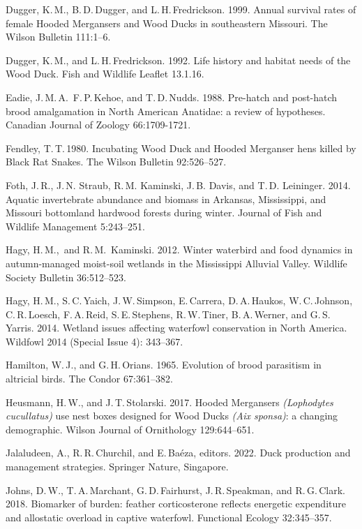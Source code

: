 \begin{hangparas}{2em}{1}
	Dugger, K.\,M., B.\,D.\,Dugger, and L.\,H.\,Fredrickson. 1999. Annual survival rates of female Hooded Mergansers and Wood Ducks in southeastern Missouri. The Wilson Bulletin 111:1–6. 
	
	Dugger, K.\,M., and L.\,H.\,Fredrickson. 1992. Life history and habitat needs of the Wood Duck. Fish and Wildlife Leaflet 13.1.16.
	
	Eadie, J.\,M.\,A.\, F.\,P.\,Kehoe, and T.\,D.\,Nudds. 1988. Pre-hatch and post-hatch brood amalgamation in North American Anatidae: a review of hypotheses. Canadian Journal of Zoology 66:1709-1721.
	
	Fendley, T.\,T.\,1980. Incubating Wood Duck and Hooded Merganser hens killed by Black Rat Snakes. The Wilson Bulletin 92:526–527. 
	
	Foth, J.\,R., J.\,N. Straub, R.\,M. Kaminski, J.\,B. Davis, and T.\,D. Leininger. 2014. Aquatic invertebrate abundance and biomass in Arkansas, Mississippi, and Missouri bottomland hardwood forests during winter. Journal of Fish and Wildlife Management 5:243–251. 
	
	Hagy, H.\,M.,~and R.\,M.\, Kaminski. 2012. Winter waterbird and food dynamics in autumn-managed moist-soil wetlands in the Mississippi Alluvial Valley. Wildlife Society Bulletin 36:512–523.
	
	Hagy, H.\,M., S.\,C.\,Yaich, J.\,W.\,Simpson, E.\,Carrera, D.\,A.\,Haukos, W.\,C.\,Johnson, C.\,R.\,Loesch, F.\,A.\,Reid, S.\,E.\,Stephens, R.\,W.\,Tiner, B.\,A.\,Werner, and G.\,S.\,Yarris. 2014. Wetland issues affecting waterfowl conservation in North America. Wildfowl 2014 (Special Issue 4): 343–367. 
	
	Hamilton, W.\,J., and G.\,H.\,Orians. 1965. Evolution of brood parasitism in altricial birds. The Condor 67:361–382. 
	
	Heusmann, H.\,W., and J.\,T.\,Stolarski. 2017. Hooded Mergansers \textit{(Lophodytes cucullatus)} use nest boxes designed for Wood Ducks \textit{(Aix sponsa)}: a changing demographic. Wilson Journal of Ornithology 129:644–651. 
	
	Jalaludeen, A., R.\,R.\,Churchil, and E.\,Baéza, editors. 2022. Duck production and management strategies. Springer Nature, Singapore. 
	
	Johns, D.\,W., T.\,A.\,Marchant, G.\,D.\,Fairhurst, J.\,R.\,Speakman, and R.\,G.\,Clark. 2018. Biomarker of burden: feather corticosterone reflects energetic expenditure and allostatic overload in captive waterfowl. Functional Ecology 32:345–357. 
	

\end{hangparas}
